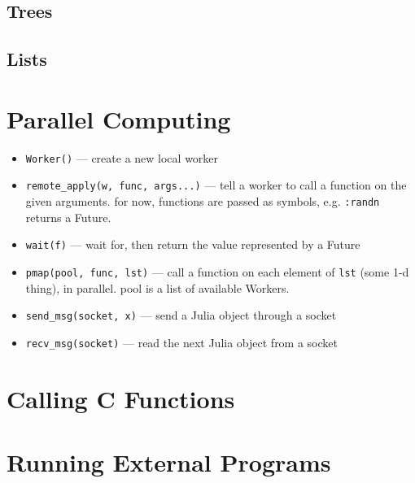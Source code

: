 \documentclass{article}
\begin{document}
\subsection{Trees}
\subsection{Lists}

\section{Parallel Computing}
\begin{itemize}
  \item \verb|Worker()| ---
     create a new local worker

  \item \verb|remote_apply(w, func, args...)| ---
     tell a worker to call a function on the given arguments.
     for now, functions are passed as symbols, e.g. \verb|:randn|
     returns a Future.

   \item \verb|wait(f)| ---
     wait for, then return the value represented by a Future

   \item \verb|pmap(pool, func, lst)| ---
     call a function on each element of \verb|lst| (some 1-d thing), in
     parallel. pool is a list of available Workers.

   \item \verb|send_msg(socket, x)| ---
     send a Julia object through a socket

   \item \verb|recv_msg(socket)| ---
     read the next Julia object from a socket
\end{itemize}

\section{Calling C Functions}
\section{Running External Programs}
\end{document}
